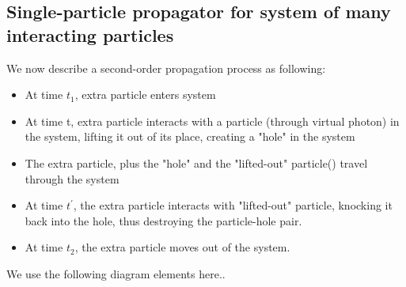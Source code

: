 \subsection{Single-particle propagator for system of many interacting particles}
We now describe a second-order propagation process as following:
\begin{itemize}
    \item At time $t_1$, extra particle enters system
    \item At time t, extra particle interacts with a particle (through virtual photon) in the system, lifting it out of its place, creating a "hole" in the system
    \item The extra particle, plus the "hole" and the "lifted-out" particle() travel through the system
    \item At time $t^{\prime}$, the extra particle interacts with  "lifted-out" particle, knocking it back into the hole, thus destroying the particle-hole pair.
    \item At time $t_2$, the extra particle moves out of the system.
\end{itemize}
We use the following diagram elements here..

